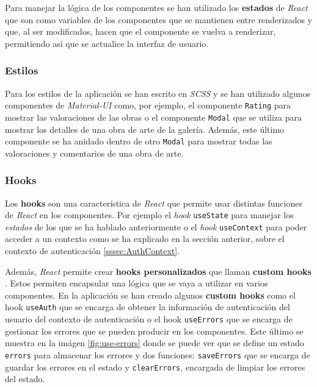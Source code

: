 Para manejar la lógica de los componentes se han utilizado los \textbf{estados} de
\textit{React} \cite{react-state} que son como variables de los componentes que se
mantienen entre renderizados y que, al ser modificados, hacen que el componente se
vuelva a renderizar, permitiendo así que se actualice la interfaz de usuario.

\subsubsection{Estilos}
Para los estilos de la aplicación se han escrito en \textit{SCSS} \cite{scss} y se han
utilizado algunos componentes de \textit{Material-UI} \cite{material-ui} como, por ejemplo,
el componente \texttt{Rating} \cite{rating} para mostrar las valoraciones de las obras o
el componente \texttt{Modal} \cite{modal} que se utiliza para mostrar los detalles de una
obra de arte de la galería. Además, este último componente se ha anidado dentro de otro
\texttt{Modal} para mostrar todas las valoraciones y comentarios de una obra de arte.

\subsubsection{Hooks}
Los \textbf{hooks} son una característica de \textit{React} \cite{react-hooks} que
permite usar distintas funciones de \textit{React} \cite{react} en los componentes.
Por ejemplo el \textit{hook} \texttt{useState} \cite{use-state} para manejar los
\textit{estados} de los que se ha hablado anteriormente o el \textit{hook}
\texttt{useContext} \cite{use-context} para poder acceder a un contexto como se ha
explicado en la sección anterior, sobre el contexto de autenticación \ref{sssec:AuthContext}.

Además, \textit{React} \cite{react} permite crear \textbf{hooks personalizados} que
llaman \textbf{custom hooks} \cite{custom-hooks}. Estos permiten encapsular una lógica
que se vaya a utilizar en varios componentes. En la aplicación se han creado algunos
\textbf{custom hooks} como el hook \texttt{useAuth} que se encarga de obtener la
información de autenticación del usuario del contexto de autenticación o el hook
\texttt{useErrors} que se encarga de gestionar los errores que se pueden producir en los
componentes. Este último se muestra en la imágen \ref{fig:use-errors} donde se puede ver
que se define un estado \texttt{errors} para almacenar los errores y dos funciones:
\texttt{saveErrors} que se encarga de guardar los errores en el estado y \texttt{clearErrors},
encargada de limpiar los errores del estado.

